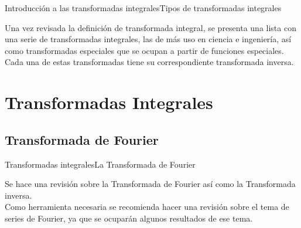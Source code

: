 \documentclass[10pt]{beamer}
\begin{document}
\begin{frame}{Introducción a las transformadas integrales}{Tipos de transformadas integrales}

Una vez revisada la definición de transformada integral, se presenta una lista con una serie de transformadas integrales, las de más uso en ciencia e ingeniería, así como transformadas especiales que se ocupan a partir de funciones especiales.
\\
\bigskip
\pause
Cada una de estas transformadas tiene su correspondiente transformada inversa.
\end{frame}

\section{Transformadas Integrales}

\subsection{Transformada de Fourier}

\begin{frame}{Transformadas integrales}{La Transformada de Fourier}

Se hace una revisión sobre la Transformada de Fourier así como la Transformada inversa.
\\
\bigskip
\pause
Como herramienta necesaria se recomienda hacer una revisión sobre el tema de series de Fourier, ya que se ocuparán algunos resultados de ese tema.
\end{frame}
\end{document}
